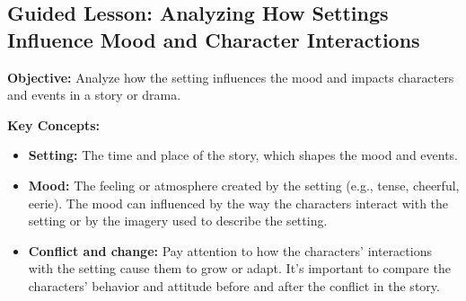 \documentclass[12pt]{article}
\title{}
\date{}
\begin{document}
\subsection*{Guided Lesson: Analyzing How Settings Influence Mood and Character Interactions}
\onehalfspacing

\begin{tcolorbox}[colframe=black!40, colback=gray!5, 
coltitle=black, colbacktitle=black!20, fonttitle=\bfseries\Large, 
title=Learning Objective, halign title=center, left=5pt, right=5pt, top=5pt, bottom=15pt]
\textbf{Objective:} Analyze how the setting influences the mood and impacts characters and events in a story or drama.
\end{tcolorbox}

\vspace{1em}

\begin{tcolorbox}[colframe=black!60, colback=white, 
coltitle=black, colbacktitle=black!15, fonttitle=\bfseries\Large, 
title=Key Concepts and Vocabulary, halign title=center, left=10pt, right=10pt, top=10pt, bottom=15pt]
\textbf{Key Concepts:}
\begin{itemize}
    \item \textbf{Setting:} The time and place of the story, which shapes the mood and events.
    \item \textbf{Mood:} The feeling or atmosphere created by the setting (e.g., tense, cheerful, eerie). The mood can influenced by the way the characters interact with the setting or by the imagery used to describe the setting.
    \item \textbf{Conflict and change:} Pay attention to how the characters' interactions with the setting cause them to grow or adapt. It's important to compare the characters' behavior and attitude before and after the conflict in the story.
\end{itemize}
\end{tcolorbox}

\vspace{1em}
\end{document}
